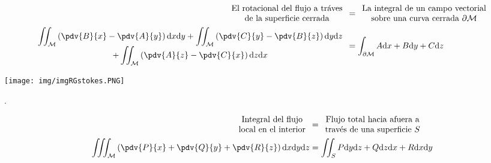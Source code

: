 \documentclass[../main]{subfiles}
\begin{document}
\begin{adjustwidth}{0pt}{-100pt}
\begin{equation}
    \begin{split}
        \begin{array}{c}
            \text{El rotacional del flujo a tráves} \\
            \text{de la superficie cerrada}
        \end{array}
        &=
        \begin{array}{c}
            \text{La integral de un campo vectorial} \\
            \text{sobre una curva cerrada} \ \partial \mathcal{M} 
        \end{array} 
        \\
        \begin{array}{c}
            \displaystyle \iint_{\mathcal{M}} \left(\pdv{B}{x}-\pdv{A}{y}\right)\mathrm{d}x\mathrm{d}y+\iint_{\mathcal{M}} \left(\pdv{C}{y}-\pdv{B}{z}\right)\mathrm{d}y\mathrm{d}z\\
            \displaystyle +\iint_{\mathcal{M}}\left(\pdv{A}{z}-\pdv{C}{x}\right)\mathrm{d}z\mathrm{d}x
        \end{array}
        &=\int_{\partial \mathcal{M}} A\mathrm{d}x+B\mathrm{d}y+C\mathrm{d}z
    \end{split}
\end{equation}

\begin{center}
    \texttt{[image: img/imgRGstokes.PNG]}
\end{center}

\teorema{\textcolor{red}{Teorema de la Divergencia}}.

\begin{equation}
    \begin{split}
        \begin{array}{c}
            \text{Integral del flujo} \\
            \text{local en el interior}
        \end{array}
        &=
        \begin{array}{c}
            \text{Flujo total hacia afuera a} \\
            \text{través de una superficie} \ S
        \end{array} 
        \\
        \iiint_{\mathcal{M}} \left(\pdv{P}{x}+\pdv{Q}{y}+\pdv{R}{z}\right)\mathrm{d}x\mathrm{d}y\mathrm{d}z&=\iint_{S} P\mathrm{d}y\mathrm{d}z+Q\mathrm{d}z\mathrm{d}x+R\mathrm{d}x\mathrm{d}y
    \end{split}
\end{equation}


\end{adjustwidth}
\end{document}
